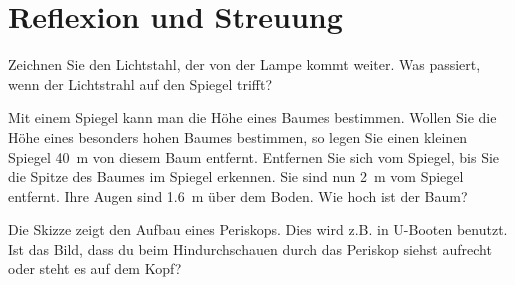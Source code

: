 \documentclass[paper=a4,twoside=true,,DIV13,BCOR1cm]{scrartcl}
\begin{document}
\newpage
\section{Reflexion und Streuung}


\begin{aufgabe}
Zeichnen Sie den Lichtstahl, der von der Lampe kommt weiter. Was passiert, wenn der Lichtstrahl auf den Spiegel trifft?	

\end{aufgabe}

\begin{aufgabe}
	Mit einem Spiegel kann man die Höhe eines Baumes bestimmen. Wollen Sie die Höhe eines besonders hohen Baumes bestimmen,
	so legen Sie einen kleinen Spiegel \SI{40}{m} von diesem Baum entfernt. Entfernen Sie sich vom Spiegel, bis Sie die
	Spitze des Baumes im Spiegel erkennen. Sie sind nun \SI{2}{m} vom Spiegel entfernt. Ihre Augen sind \SI{1.6}{m} über dem Boden.
	Wie hoch ist der Baum?
\end{aufgabe}

\begin{minipage}{0.5\textwidth}
\begin{aufgabe}
	Die Skizze zeigt den Aufbau eines Periskops. Dies wird z.B. in U-Booten benutzt. Ist das Bild, dass du beim Hindurchschauen
	durch das Periskop siehst aufrecht oder steht es auf dem Kopf?
\end{aufgabe}
\end{minipage}
\begin{minipage}{0.5\textwidth}

\end{minipage}
\end{document}
